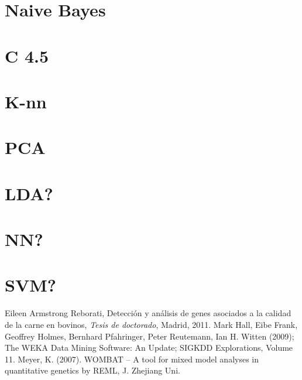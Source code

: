 \documentclass[12pt,a4paper,titlepage]{report}
\begin{document}
	\section{Naive Bayes}
	
	\section{C 4.5}
	
	\section{K-nn}
	
	\section{PCA}
	
	\section{LDA?}
	
	\section{NN?}
	
	\section{SVM?}








\begin{thebibliography}{99}
\begin{small}

Eileen Armstrong Reborati, Detección y análisis de genes asociados a la calidad de la carne en bovinos, \emph{Tesis de doctorado}, Madrid, 2011.
Mark Hall, Eibe Frank, Geoffrey Holmes, Bernhard Pfahringer, Peter Reutemann, Ian H. Witten (2009); The WEKA Data Mining Software: An Update; SIGKDD Explorations, Volume 11.
Meyer, K. (2007). WOMBAT – A tool for mixed model analyses in quantitative genetics by REML, J. Zhejiang Uni.

\end{small}
\end{thebibliography}
\end{document}
